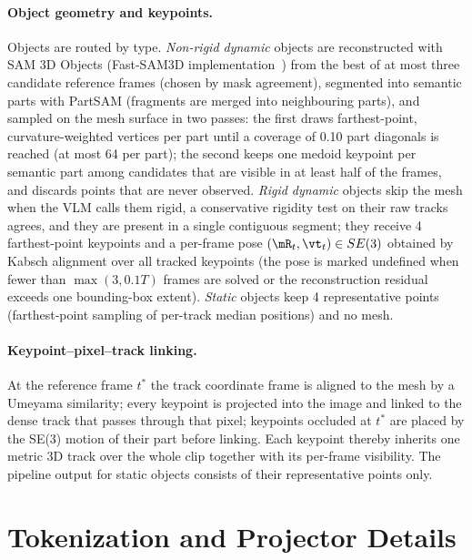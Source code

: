 \paragraph{Object geometry and keypoints.}
Objects are routed by type.
\emph{Non-rigid dynamic} objects are reconstructed with SAM 3D Objects (Fast-SAM3D implementation~\citep{fengFastSAM3D3DfyAnything2026}) from the best of at most three candidate reference frames (chosen by mask agreement), segmented into semantic parts with PartSAM (fragments are merged into neighbouring parts), and sampled on the mesh surface in two passes: the first draws farthest-point, curvature-weighted vertices per part until a coverage of 0.10 part diagonals is reached (at most 64 per part); the second keeps one medoid keypoint per semantic part among candidates that are visible in at least half of the frames, and discards points that are never observed.
\emph{Rigid dynamic} objects skip the mesh when the VLM calls them rigid, a conservative rigidity test on their raw tracks agrees, and they are present in a single contiguous segment; they receive 4 farthest-point keypoints and a per-frame pose $(\mR_t,\vt_t)\in SE(3)$ obtained by Kabsch alignment over all tracked keypoints (the pose is marked undefined when fewer than $\max(3,0.1T)$ frames are solved or the reconstruction residual exceeds one bounding-box extent).
\emph{Static} objects keep 4 representative points (farthest-point sampling of per-track median positions) and no mesh.

\paragraph{Keypoint--pixel--track linking.}
At the reference frame $t^\ast$ the track coordinate frame is aligned to the mesh by a Umeyama similarity; every keypoint is projected into the image and linked to the dense track that passes through that pixel; keypoints occluded at $t^\ast$ are placed by the SE(3) motion of their part before linking.
Each keypoint thereby inherits one metric 3D track over the whole clip together with its per-frame visibility.
The pipeline output for static objects consists of their representative points only.

\section{Tokenization and Projector Details}
\label{app:tokenization}

